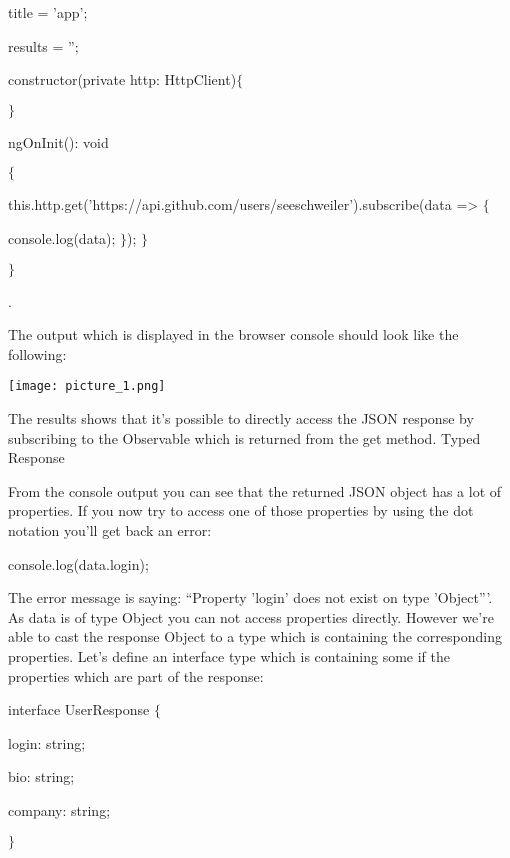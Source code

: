 \documentclass[11pt,twoside]{article}
\begin{document}
title = 'app';

results = ”;

constructor(private http: HttpClient)$\{$

$\}$

ngOnInit(): void 

$\{$

\hspace*{25} this.http.get('https://api.github.com/users/seeschweiler').subscribe(data => $\{$

console.log(data); $\}$); $\}$

$\}$

\vspace{17\baselineskip}
.

The output which is displayed in the browser console should look like the following:
\begin{center}
  \texttt{[image: picture\_1.png]}
\end{center}

 The results shows that it's possible to directly access the JSON response by subscribing to the Observable which is returned from the get method.
Typed Response
\vspace{1\baselineskip}

From the console output you can see that the returned JSON object has a lot of properties. If you now try to access one of those properties by using the dot notation you'll get back an error:

\vspace{1\baselineskip}
console.log(data.login);

\vspace{1\baselineskip}
The error message is saying: “Property 'login' does not exist on type 'Object”'. As data is of type Object you can not access properties directly. However we're able to cast the response Object to a type which is containing the corresponding properties. Let's define an interface type which is containing some if the properties which are part of the response:

\vspace{1\baselineskip}
interface UserResponse $\{$

\hspace*{10} login: string;

\hspace*{10} bio: string;

\hspace*{10} company: string;

$\}$
\end{document}
